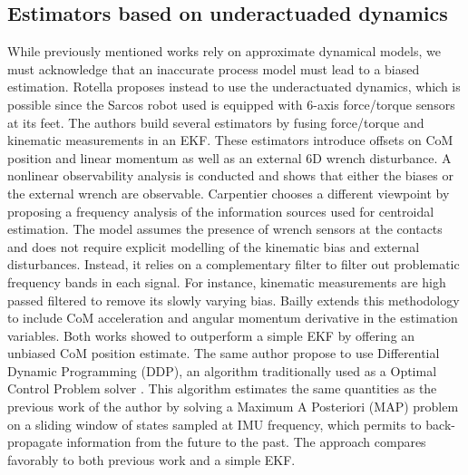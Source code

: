 \subsection{Estimators based on underactuaded dynamics}
While previously mentioned works rely on approximate dynamical models, we must acknowledge that an inaccurate process model must lead to a biased estimation. 
Rotella \cite{rotella2015humanoid} proposes instead to use the underactuated dynamics, which is possible since the Sarcos robot used is equipped with 6-axis
force/torque sensors at its feet. 
The authors build several estimators by fusing force/torque and kinematic measurements in an EKF. 
These estimators introduce offsets on CoM position and linear momentum as well as an external 6D wrench disturbance. A nonlinear observability analysis is conducted 
and shows that either the biases or the external wrench are observable. 
Carpentier \cite{carpentier2016center} chooses a different viewpoint by proposing a frequency analysis of the information sources used for centroidal estimation. The model
assumes the presence of wrench sensors at the contacts and does not require explicit modelling of the kinematic bias and external disturbances. Instead, it relies on a complementary filter
to filter out problematic frequency bands in each signal. For instance, kinematic measurements are high passed filtered to remove its slowly varying bias. 
Bailly \cite{bailly2019recursive} extends this methodology to include CoM acceleration and angular momentum derivative in the estimation variables. Both works showed to outperform
a simple EKF by offering an unbiased CoM position estimate.
The same author \cite{bailly2021optimal} propose to use Differential Dynamic Programming (DDP), an algorithm traditionally used as a Optimal Control Problem solver \cite{mastalli2020crocoddyl}.
This algorithm estimates the same quantities as the previous work of the author \cite{bailly2019recursive} by solving a Maximum A Posteriori (MAP) problem on a sliding window of states sampled at IMU frequency, 
which permits to back-propagate information from the future to the past. The approach compares favorably to both previous work \cite{bailly2019recursive} and a simple EKF.





